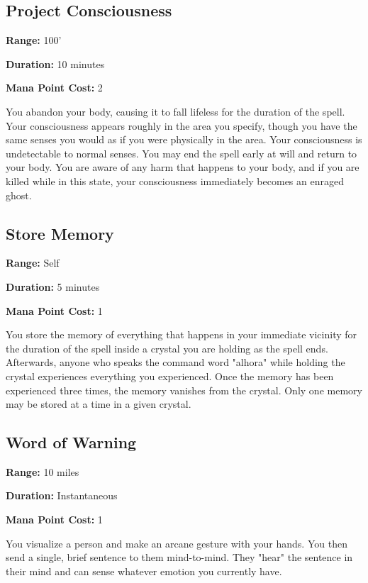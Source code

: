 \begin{multicols}{2}
\subsection{Project Consciousness}

\textbf{Range:} 100'

\textbf{Duration:} 10 minutes

\textbf{Mana Point Cost:} 2

You abandon your body, causing it to fall lifeless for the duration of
the spell. Your consciousness appears roughly in the area you specify,
though you have the same senses you would as if you were physically in
the area. Your consciousness is undetectable to normal senses. You
may end the spell early at will and return to your body. You are aware
of any harm that happens to your body, and if you are killed while in
this state, your consciousness immediately becomes an enraged ghost.

\subsection{Store Memory}

\textbf{Range:} Self

\textbf{Duration:} 5 minutes

\textbf{Mana Point Cost:} 1

You store the memory of everything that happens in your immediate
vicinity for the duration of the spell inside a crystal you are holding
as the spell ends. Afterwards, anyone who speaks the command word
"alhora" while holding the crystal experiences everything you
experienced. Once the memory has been experienced three times, the
memory vanishes from the crystal. Only one memory may be stored at a
time in a given crystal.

\subsection{Word of Warning}

\textbf{Range:} 10 miles

\textbf{Duration:} Instantaneous

\textbf{Mana Point Cost:} 1

You visualize a person and make an arcane gesture with your hands.
You then send a single, brief sentence to them mind-to-mind. They
"hear" the sentence in their mind and can sense whatever emotion
you currently have.

\end{multicols}
